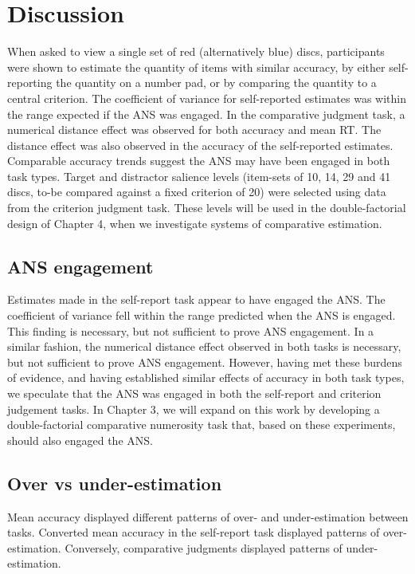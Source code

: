 \section{Discussion}
When asked to view a single set of red (alternatively blue) discs, participants were shown to estimate the quantity of items with similar accuracy, by either self-reporting the quantity on a number pad, or by comparing the quantity to a central criterion. The coefficient of variance for self-reported estimates was within the range expected if the ANS was engaged. In the comparative judgment task, a numerical distance effect was observed for both accuracy and mean RT. The distance effect was also observed in the accuracy of the self-reported estimates. Comparable accuracy trends suggest the ANS may have been engaged in both task types. Target and distractor salience levels (item-sets of 10, 14, 29 and 41 discs, to-be compared against a fixed criterion of 20) were selected using data from the criterion judgment task. These levels will be used in the double-factorial design of Chapter 4, when we investigate systems of comparative estimation.

\subsection{ANS engagement}
Estimates made in the self-report task appear to have engaged the ANS. The coefficient of variance fell within the range predicted when the ANS is engaged. This finding is necessary, but not sufficient to prove ANS engagement. In a similar fashion, the numerical distance effect observed in both tasks is necessary, but not sufficient to prove ANS engagement. However, having met these burdens of evidence, and having established similar effects of accuracy in both task types, we speculate that the ANS was engaged in both the self-report and criterion judgement tasks. In Chapter 3, we will expand on this work by developing a double-factorial comparative numerosity task that, based on these experiments, should also engaged the ANS. 


\subsection{Over vs under-estimation}
Mean accuracy displayed different patterns of over- and under-estimation between tasks. Converted mean accuracy in the self-report task displayed patterns of over-estimation. Conversely, comparative judgments displayed patterns of under-estimation. 

